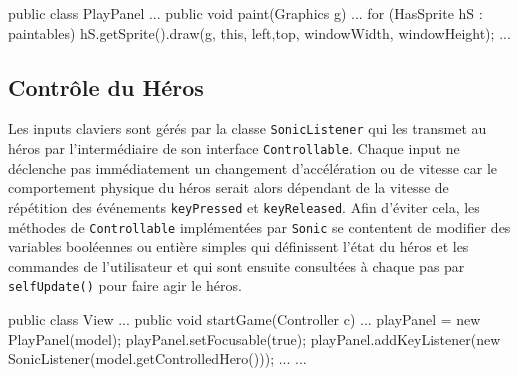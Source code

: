 \documentclass[a4paper, 12pt]{article}
\begin{document}
\begin{java}
public class PlayPanel{
  ...
  public void paint(Graphics g){
    ...
    for (HasSprite hS : paintables){
      hS.getSprite().draw(g, this, left,top, windowWidth, windowHeight);
    }
  }
  ...
}
\end{java}

\vspace{1em}


\subsection{Contrôle du Héros}

Les inputs claviers sont gérés par la classe {\tt SonicListener} qui les transmet au héros par l'intermédiaire de son interface {\tt Controllable}. Chaque input ne déclenche pas immédiatement un changement d'accélération ou de vitesse car le comportement physique du héros serait alors dépendant de la vitesse de répétition des événements {\tt keyPressed} et {\tt keyReleased}. Afin d'éviter cela, les méthodes de {\tt Controllable} implémentées par {\tt Sonic} se contentent de modifier des variables booléennes ou entière simples qui définissent l'état du héros et les commandes de l'utilisateur et qui sont ensuite consultées à chaque pas par {\tt selfUpdate()} pour faire agir le héros.

\begin{java}
public class View{
  ...
    public void startGame(Controller c){
    ...
    playPanel = new PlayPanel(model);
    playPanel.setFocusable(true);
    playPanel.addKeyListener(new SonicListener(model.getControlledHero()));
    ...
  }
  ...
}
\end{java}
\end{document}
